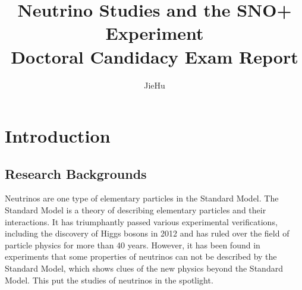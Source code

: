 \documentclass[preprint,12pt]{elsarticle}
\begin{document}
\begin{frontmatter}



\title{Neutrino Studies and the SNO+ Experiment\\
	Doctoral Candidacy Exam Report
	}


\author{Jie\quad Hu}

\address{Department of Physics, University of Alberta}

\end{frontmatter}


\section{Introduction}

\subsection{Research Backgrounds}
Neutrinos are one type of elementary particles in the Standard Model. The Standard Model is a theory of describing elementary particles and their interactions. It has triumphantly passed various experimental verifications, including the discovery of Higgs bosons in 2012 and has ruled over the field of particle physics for more than 40 years. However, it has been found in experiments that some properties of neutrinos can not be described by the Standard Model, which shows clues of the new physics beyond the Standard Model. This put the studies of neutrinos in the spotlight.
\end{document}
